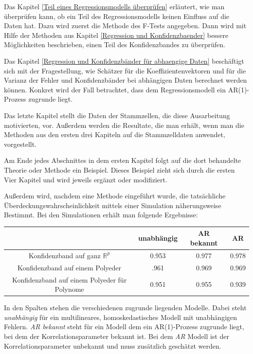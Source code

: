 \documentclass[12pt,a4paper]{article}
\theoremstyle{definition}
\theoremstyle{definition}
\theoremstyle{definition}
\theoremstyle{definition}
\newcommand{\UeberRR}{0.953}
\newcommand{\UeberRMinmax}{.961}
\newcommand{\UeberRMinmaxPolyfast}{0.951}
\newcommand{\UeberARbekanntR}{0.977}
\newcommand{\UeberARbekanntMinmax}{0.969}
\newcommand{\UeberARbekanntMinmaxPolyfast}{0.955}
\newcommand{\UeberARR}{0.978}
\newcommand{\UeberARMinmax}{0.969}
\newcommand{\UeberARMinmaxPolyfast}{0.939}
\begin{document}
Das Kapitel \ref{Teil eines Regressionsmodells überprüfen} erläutert, wie man überprüfen kann, ob ein Teil des Regressionsmodells keinen Einfluss auf die Daten hat. Dazu wird zuerst die Methode des F-Tests angegeben. Dann wird mit Hilfe der Methoden aus Kapitel \ref{Regression und Konfidenzbaender} bessere Möglichkeiten beschrieben, einen Teil des Konfidenzbandes zu überprüfen.

Das Kapitel \ref{Regression und Konfidenzbänder für abhaengige Daten} beschäftigt sich mit der Fragestellung, wie Schätzer für die Koeffizientenvektoren und für die Varianz der Fehler und Konfidenzbänder bei abhängigen Daten berechnet werden können. Konkret wird der Fall betrachtet, dass dem Regressionsmodell ein AR(1)-Prozess zugrunde liegt.

Das letzte Kapitel stellt die Daten der Stammzellen, die diese Ausarbeitung motivierten, vor. Außerdem werden die Resultate, die man erhält, wenn man die Methoden aus den ersten drei Kapiteln auf die Stammzelldaten anwendet, vorgestellt.

Am Ende jedes Abschnittes in dem ersten Kapitel folgt auf die dort behandelte Theorie oder Methode ein Beispiel. Dieses Beispiel zieht sich durch die ersten Vier Kapitel und wird jeweils ergänzt oder modifiziert.

Außerdem wird, nachdem eine Methode eingeführt wurde, die tatsächliche Überdeckungswahrscheinlichkeit mittels einer Simulation näherungsweise Bestimmt. Bei den Simulationen erhält man folgende Ergebnisse:

\begin{center}
\begin{tabular}{|c|c|c|c|}
\hline 
 & unabhängig & AR bekannt & AR \\ 
\hline 
Konfidenzband auf ganz $\mathbb{R}^{p}$		 & \UeberRR		  & \UeberARbekanntR & \UeberARR \\ 
\hline 
Konfidenzband auf einem Polyeder	 & \UeberRMinmax  & \UeberARbekanntMinmax & \UeberARMinmax \\ 
\hline 
Konfidenzband auf einem Polyeder für Polynome  & \UeberRMinmaxPolyfast & \UeberARbekanntMinmaxPolyfast & \UeberARMinmaxPolyfast \\ 
\hline 
\end{tabular} 
\end{center}

In den Spalten stehen die verschiedenen zugrunde liegenden Modelle. Dabei steht \textit{unabhängig} für ein  multilineares, homoskedastisches Modell mit unabhängigen Fehlern. \textit{AR bekannt} steht für ein Modell dem ein AR(1)-Prozess zugrunde liegt, bei dem der Korrelationsparameter bekannt ist. Bei dem \textit{AR} Modell ist der Korrelationsparameter unbekannt und muss zusätzlich geschätzt werden.
\end{document}
